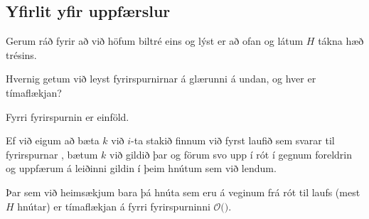 \subsection{Yfirlit yfir uppfærslur}
{
    {
        \item<1-> Gerum ráð fyrir að við höfum biltré eins og lýst er að ofan og látum $H$ tákna hæð trésins.
        \item<2-> Hvernig getum við leyst fyrirspurnirnar á glærunni á undan, og hver er tímaflækjan?
        \item<3-> Fyrri fyrirspurnin er einföld.
        \item<4-> Ef við eigum að bæta $k$ við $i$-ta stakið finnum við fyrst laufið sem svarar til fyrirspurnar ,
                    bætum $k$ við gildið þar og förum svo upp í rót í gegnum foreldrin og uppfærum á leiðinni gildin í þeim hnútum sem við lendum.
        \item<5-> Þar sem við heimsækjum bara þá hnúta sem eru á veginum frá rót til laufs (mest $H$ hnútar)
                    er tímaflækjan á fyrri fyrirspurninni $\mathcal{O}($$)$.
    }
}

